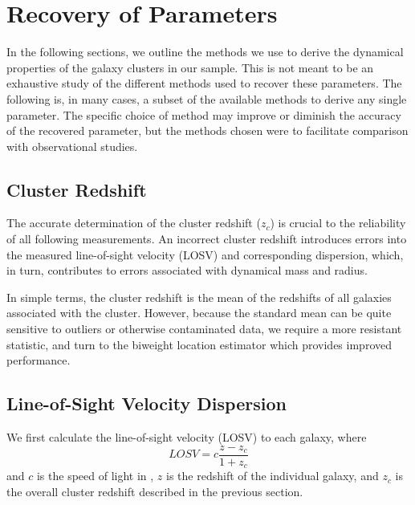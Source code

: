 \documentclass[fleqn,usenatbib]{mnras}
\begin{document}
\section{Recovery of Parameters}\label{sec:recovery}
 In the following sections, we outline the methods we use to derive the dynamical properties of the galaxy clusters in our sample. This is not meant to be an exhaustive study of the different methods used to recover these parameters. The following is, in many cases, a subset of the available methods to derive any single parameter. The specific choice of method may improve or diminish the accuracy of the recovered parameter, but the methods chosen were to facilitate comparison with observational studies. 

\subsection{Cluster Redshift}
The accurate determination of the cluster redshift ($z_c$) is crucial to the reliability of all following measurements. An incorrect cluster redshift introduces errors into the measured line-of-sight velocity (LOSV) and corresponding dispersion, which, in turn, contributes to errors associated with dynamical mass and radius. 

In simple terms, the cluster redshift is the mean of the redshifts of all galaxies associated with the cluster. However, because the standard mean can be quite sensitive to outliers or otherwise contaminated data, we require a more resistant statistic, and turn to the biweight location estimator \citep{Beers1990} which provides improved performance. 

\subsection{Line-of-Sight Velocity Dispersion}\label{sec: LOSVD}
We first calculate the line-of-sight velocity (LOSV) to each galaxy, where
\begin{equation}
	LOSV = c\frac{z - z_c}{1+z_c}
\end{equation}
and $c$ is the speed of light in \kms, $z$ is the redshift of the individual galaxy, and $z_c$ is the overall cluster redshift described in the previous section.
\end{document}

